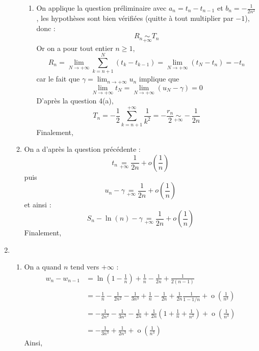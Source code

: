 \documentclass[a4paper,twoside,french,10pt]{VcCours}
\begin{document}
\begin{enumerate}
\begin{enumerate}
\begin{enumerate}
                \item On applique la question préliminaire avec $a_n=t_n-t_{n-1}$ et $b_n=-\frac{1}{2n^2}$, les hypothèses sont bien vérifiées (quitte à tout multiplier par $-1$), donc :
                $$R_n \mathop{\sim}\limits_{+\infty} T_n$$
    Or on a pour tout entier $n \geq 1$,
    $$R_n=\lim_{N\to+\infty}\sum_{k=n+1}^N (t_k-t_{k-1})=\lim_{N\to+\infty}(t_N-t_n)=-t_n$$
    car le fait que $\gamma=\lim_{n\to+\infty} u_n$ implique que 
    $$\lim_{N\to+\infty}t_N=\lim_{N\to+\infty} (u_N-\gamma)=0$$
    D'après la question 4(a), 
    $$T_n=-\frac{1}{2}\sum_{k=n+1}^{+\infty} \frac{1}{k^2}=-\frac{r_n}{2}\mathop{\sim}\limits_{+\infty}-\frac{1}{2n}$$
    Finalement,
                
                
                
            \end{enumerate}
            
            \item On a d'après la question précédente :
            $$ t_n \underset{+ \infty}{=} \dfrac{1}{2n} + o \left(  \dfrac{1}{n} \right)$$
            puis 
            $$ u_n - \gamma \underset{+ \infty}{=} \dfrac{1}{2n} + o \left(  \dfrac{1}{n} \right)$$
            et ainsi :
            $$ S_n - \ln(n) - \gamma \underset{+ \infty}{=} \dfrac{1}{2n} + o \left(  \dfrac{1}{n} \right)$$
    Finalement,
    
        
    
        \end{enumerate}
        
        
        
        \item 
        
        
        \begin{enumerate}
            \item On a quand $n$ tend vers $+ \infty$ :
    \begin{align*}
    w_n-w_{n-1} & =  \ln\left(1-\frac{1}{n}\right)+\frac{1}{n}-\frac{1}{2n}+\frac{1}{2(n-1)}\\
        \\
        & =  -\frac{1}{n}-\frac{1}{2n^2}-\frac{1}{3n^3}+\frac{1}{n}-\frac{1}{2n}+\frac{1}{2n}\frac{1}{1-1/n} + \mathop{o}\left(\frac{1}{n^3}\right)\\
        \\
        & =  -\frac{1}{2n^2}-\frac{1}{3n^3}-\frac{1}{2n}+\frac{1}{2n}\left(1+\frac{1}{n}+\frac{1}{n^2}\right)+\mathop{o}\left(\frac{1}{n^3}\right)\\
        \\
        & =  -\frac{1}{3n^3}+\frac{1}{2n^3}+\mathop{o}\left(\frac{1}{n^3}\right)	
        \end{align*}
    Ainsi,
        

\end{enumerate}
\end{enumerate}
\end{document}
